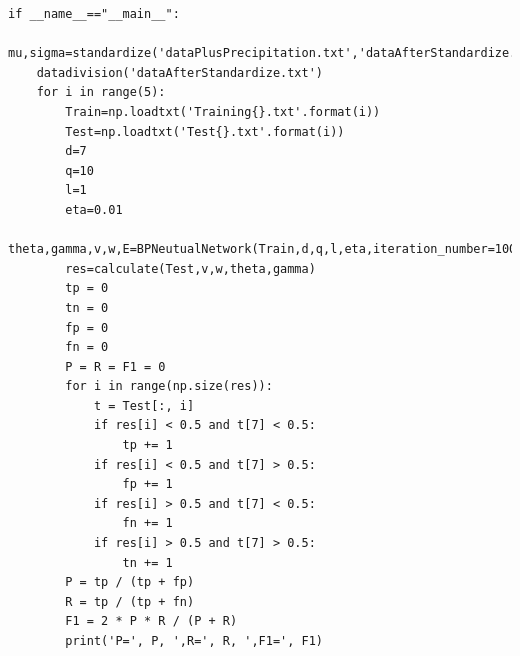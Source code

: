 \documentclass{ctexart}
\begin{document}
\begin{scriptsize}
\begin{verbatim}
if __name__=="__main__":
    mu,sigma=standardize('dataPlusPrecipitation.txt','dataAfterStandardize.txt')
    datadivision('dataAfterStandardize.txt')
    for i in range(5):
        Train=np.loadtxt('Training{}.txt'.format(i))
        Test=np.loadtxt('Test{}.txt'.format(i))
        d=7
        q=10
        l=1
        eta=0.01
        theta,gamma,v,w,E=BPNeutualNetwork(Train,d,q,l,eta,iteration_number=100)
        res=calculate(Test,v,w,theta,gamma)
        tp = 0
        tn = 0
        fp = 0
        fn = 0
        P = R = F1 = 0
        for i in range(np.size(res)):
            t = Test[:, i]
            if res[i] < 0.5 and t[7] < 0.5:
                tp += 1
            if res[i] < 0.5 and t[7] > 0.5:
                fp += 1
            if res[i] > 0.5 and t[7] < 0.5:
                fn += 1
            if res[i] > 0.5 and t[7] > 0.5:
                tn += 1
        P = tp / (tp + fp)
        R = tp / (tp + fn)
        F1 = 2 * P * R / (P + R)
        print('P=', P, ',R=', R, ',F1=', F1)

\end{verbatim}
\end{scriptsize}
\end{document}
